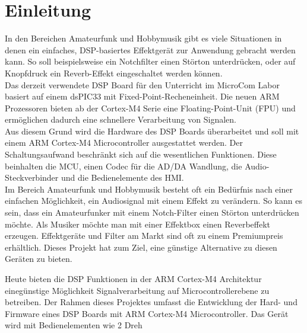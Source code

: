 \section{Einleitung}
\label{sec:Einleitung}

In den Bereichen Amateurfunk und Hobbymusik gibt es viele Situationen in denen ein einfaches, DSP-basiertes Effektgerät zur Anwendung gebracht werden kann. So soll beispielsweise ein Notchfilter einen Störton unterdrücken, oder auf Knopfdruck ein Reverb-Effekt eingeschaltet werden können. \\

Das derzeit verwendete DSP Board für den Unterricht im MicroCom Labor basiert auf einem dsPIC33 mit Fixed-Point-Recheneinheit. Die neuen ARM Prozessoren bieten ab der Cortex-M4 Serie eine Floating-Point-Unit (FPU) und ermöglichen dadurch eine schnellere Verarbeitung von Signalen. \\

Aus diesem Grund wird die Hardware des DSP Boards überarbeitet und soll mit einem ARM Cortex-M4 Microcontroller ausgestattet werden. Der Schaltungsaufwand beschränkt sich auf die wesentlichen Funktionen. Diese beinhalten die MCU, einen Codec für die AD/DA Wandlung, die Audio-Steckverbinder und die Bedienelemente des HMI. \\

Im Bereich Amateurfunk und Hobbymusik besteht oft ein Bedürfnis nach einer einfachen Möglichkeit, ein Audiosignal mit einem Effekt zu verändern.
So kann es sein, dass ein Amateurfunker mit einem Notch-Filter einen Störton unterdrücken möchte. Als Musiker möchte man mit einer Effektbox einen Reverbeffekt erzeugen.
Effektgeräte und Filter am Markt sind oft zu einem Premiumpreis erhältlich.
Dieses Projekt hat zum Ziel, eine günstige Alternative zu diesen Geräten zu bieten.


Heute bieten die DSP Funktionen in der ARM Cortex-M4 Architektur einegünstige Möglichkeit Signalverarbeitung auf Microcontrollerebene zu betreiben. 
Der Rahmen dieses Projektes umfasst die Entwicklung der Hard- und Firmware eines DSP Boards mit ARM Cortex-M4 Microcontroller. 
Das Gerät wird mit Bedienelementen wie 2 Dreh
